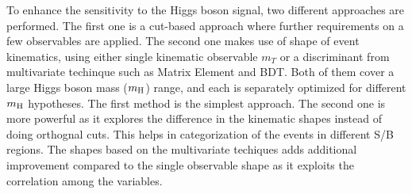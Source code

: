 To enhance the sensitivity to the Higgs boson signal, two different approaches 
are performed. The first one is a cut-based approach where further requirements 
on a few observables are applied. The second one makes use of shape of 
event kinematics, using either single kinematic observable $m_T$ or 
a discriminant from multivariate techinque such as Matrix Element and BDT. 
Both of them cover a large Higgs boson mass ($m_{\rm{H}}$) range, 
and each is separately optimized for different
$m_{\rm{H}}$ hypotheses. The first method is the simplest approach. 
The second one is more powerful as it explores the difference in the kinematic 
shapes instead of doing orthognal cuts. This helps in categorization of the 
events in different S/B regions. 
The shapes based on the multivariate techiques adds additional improvement 
compared to the single observable shape as it exploits the 
correlation among the variables. 
		







